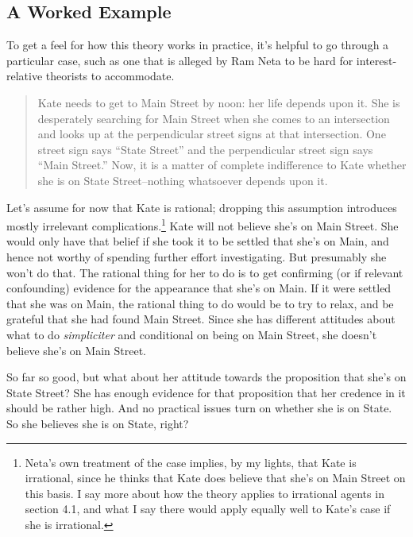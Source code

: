 \subsection{A Worked Example}
To get a feel for how this theory works in practice, it's helpful to go through a particular case, such as one that is alleged by Ram Neta to be hard for interest-relative theorists to accommodate.

\begin{quote}
Kate needs to get to Main Street by noon: her life depends upon it. She is desperately searching for Main Street when she comes to an intersection and looks up at the perpendicular street signs at that intersection. One street sign says ``State Street'' and the perpendicular street sign says ``Main Street.'' Now, it is a matter of complete indifference to Kate whether she is on State Street--nothing whatsoever depends upon it. \citep[182]{Neta2007}
\end{quote}

\noindent Let's assume for now that Kate is rational; dropping this assumption introduces mostly irrelevant complications.\footnote{Neta's own treatment of the case implies, by my lights, that Kate is irrational, since he thinks that Kate does believe that she's on Main Street on this basis. I say more about how the theory applies to irrational agents in section 4.1, and what I say there would apply equally well to Kate's case if she is irrational.} Kate will not believe she's on Main Street. She would only have that belief if she took it to be settled that she's on Main, and hence not worthy of spending further effort investigating. But presumably she won't do that. The rational thing for her to do is to get confirming (or if relevant confounding) evidence for the appearance that she's on Main. If it were settled that she was on Main, the rational thing to do would be to try to relax, and be grateful that she had found Main Street. Since she has different attitudes about what to do \textit{simpliciter} and conditional on being on Main Street, she doesn't believe she's on Main Street.

So far so good, but what about her attitude towards the proposition that she's on State Street? She has enough evidence for that proposition that her credence in it should be rather high. And no practical issues turn on whether she is on State. So she believes she is on State, right?

